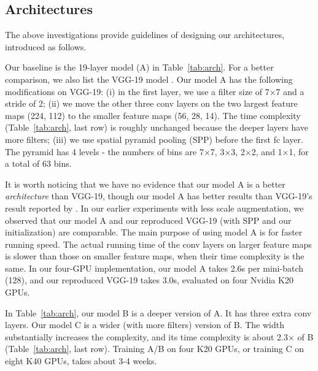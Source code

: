 \documentclass[10pt,twocolumn,letterpaper]{article}
\begin{document}
\subsection{Architectures}
\label{sec:arch}

The above investigations provide guidelines of designing our architectures, introduced as follows.

Our baseline is the 19-layer model (A) in Table~\ref{tab:arch}. For a better comparison, we also list the VGG-19 model \cite{Simonyan2014}. Our model A has the following modifications on VGG-19: (i) in the first layer, we use a filter size of 7$\times$7 and a stride of 2; (ii) we move the other three conv layers on the two largest feature maps (224, 112) to the smaller feature maps (56, 28, 14). The time complexity (Table~\ref{tab:arch}, last row) is roughly unchanged because the deeper layers have more filters; (iii) we use spatial pyramid pooling (SPP) \cite{He2014} before the first fc layer. The pyramid has 4 levels - the numbers of bins are 7$\times$7, 3$\times$3, 2$\times$2, and 1$\times$1, for a total of 63 bins.

It is worth noticing that we have no evidence that our model A is a better \emph{architecture} than VGG-19, though our model A has better results than VGG-19's result reported by \cite{Simonyan2014}. In our earlier experiments with less scale augmentation, we observed that our model A and our reproduced VGG-19 (with SPP and our initialization) are comparable. The main purpose of using model A is for faster running speed. The actual running time of the conv layers on larger feature maps is slower than those on smaller feature maps, when their time complexity is the same. In our four-GPU implementation, our model A takes 2.6s per mini-batch (128), and our reproduced VGG-19 takes 3.0s, evaluated on four Nvidia K20 GPUs.

In Table~\ref{tab:arch}, our model B is a deeper version of A. It has three extra conv layers. Our model C is a wider (with more filters) version of B. The width substantially increases the complexity, and its time complexity is about 2.3$\times$ of B (Table~\ref{tab:arch}, last row). Training A/B on four K20 GPUs, or training C on eight K40 GPUs, takes about 3-4 weeks.
\end{document}
